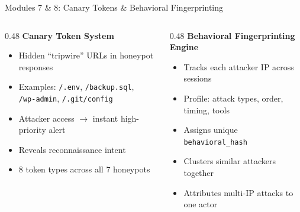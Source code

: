 \documentclass[aspectratio=169,12pt]{beamer}
\begin{document}
\begin{frame}{Modules 7 \& 8: Canary Tokens \& Behavioral Fingerprinting}
  \begin{columns}[T]
    \begin{column}{0.48\textwidth}
      \textbf{\textcolor{dcYellow}{Canary Token System}}
      \begin{itemize}
        \item Hidden ``tripwire'' URLs in honeypot responses
        \item Examples: \texttt{/.env}, \texttt{/backup.sql},\\
              \texttt{/wp-admin}, \texttt{/.git/config}
        \item Attacker access $\rightarrow$ instant high-priority alert
        \item Reveals reconnaissance intent
        \item 8 token types across all 7 honeypots
      \end{itemize}
    \end{column}
    \begin{column}{0.48\textwidth}
      \textbf{\textcolor{dcPurple}{Behavioral Fingerprinting Engine}}
      \begin{itemize}
        \item Tracks each attacker IP across sessions
        \item Profile: attack types, order, timing, tools
        \item Assigns unique \texttt{behavioral\_hash}
        \item Clusters similar attackers together
        \item Attributes multi-IP attacks to one actor
      \end{itemize}
    \end{column}
  \end{columns}
\end{frame}
\end{document}
